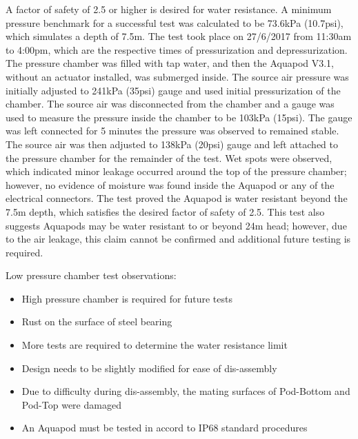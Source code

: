 A factor of safety of 2.5 or higher is desired for water resistance. A minimum pressure benchmark for a successful test was calculated to be 73.6kPa (10.7psi), which simulates a depth of 7.5m.
The test took place on 27/6/2017 from 11:30am to 4:00pm, which are the respective times of pressurization and depressurization.
The pressure chamber was filled with tap water, and then the Aquapod V3.1, without an actuator installed, was submerged inside.
The source air pressure was initially adjusted to 241kPa (35psi) gauge and used initial pressurization of the chamber.
The source air was disconnected from the chamber and a gauge was used to measure the pressure inside the chamber to be 103kPa (15psi). 
The gauge was left connected for 5 minutes the pressure was observed to remained stable. 
The source air was then adjusted to 138kPa (20psi) gauge and left attached to the pressure chamber for the remainder of the test. 
Wet spots were observed, which indicated minor leakage occurred around the top of the pressure chamber; however, no evidence of moisture was found inside the Aquapod or any of the electrical connectors.
The test proved the Aquapod is water resistant beyond the 7.5m depth, which satisfies the desired factor of safety of 2.5.
This test also suggests Aquapods may be water resistant to or beyond 24m head; however, due to the air leakage, this claim cannot be confirmed and additional future testing is required.

Low pressure chamber test observations:
\begin{itemize}
    \item High pressure chamber is required for future tests
    
    \item Rust on the surface of steel bearing 
    
    \item More tests are required to determine the water resistance limit

    \item Design needs to be slightly modified for ease of dis-assembly

    \item Due to difficulty during dis-assembly, the mating surfaces of Pod-Bottom and Pod-Top were damaged
    
    \item An Aquapod must be tested in accord to IP68 standard procedures 
    
\end{itemize}


